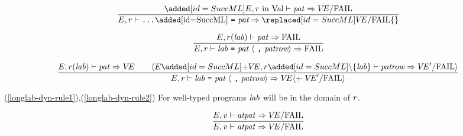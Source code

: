 \begin{equation}	%
\frac{\ADD{\E,r\ \In\ \Val\ts\pat\ra\VE/\fail}}
     {\E,\r\ts\wildrec\ra\REPL{\VE/\fail }{\emptymap}}\index{56.2}
\end{equation}


\begin{equation}	%
\label{longlab-dyn-rule1}
\frac{\E,\r(\lab)\ts\pat\ra\FAIL}
     {\E,\r\ts\longlabpats\ra\FAIL}
\end{equation}

\begin{equation}	%
\label{longlab-dyn-rule2}
\frac{\E,\r(\lab)\ts\pat\ra\VE\qquad
      \langle\E\ADD{+\VE},\r\ADD{\setminus\{\lab\}}\ts\labpats\ra\VE'/\fail\rangle }
     {\E,\r\ts\longlabpats\ra
      \VE\langle +\ \VE'/\fail\rangle}
\end{equation}
\comments
\begin{description}
\item{(\ref{longlab-dyn-rule1}),(\ref{longlab-dyn-rule2})}
For well-typed programs ${\it lab}$ will be in the domain of $r$.
\end{description}

%
%

\begin{equation}	%
\frac{\E,\V\ts\atpat\ra \VE/\fail}
     {\E,\V\ts\atpat\ra \VE/\fail}\index{56.3}
\end{equation}


